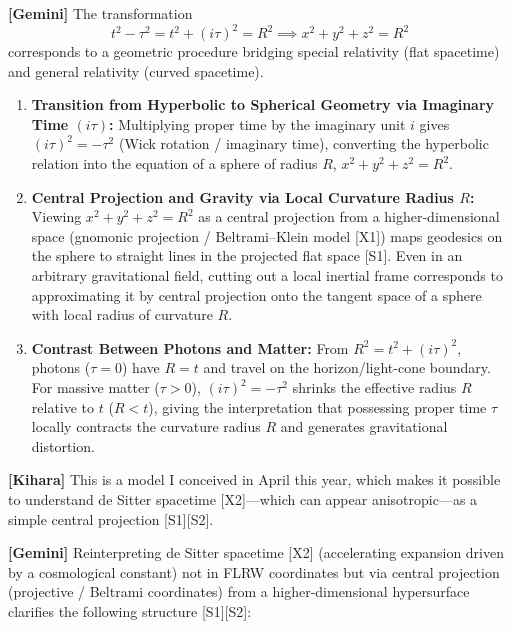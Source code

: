 \documentclass[
  a4paper,
]{article}
\providecommand{\tightlist}{%
  \setlength{\itemsep}{0pt}\setlength{\parskip}{0pt}}
\begin{document}
\textbf{{[}Gemini{]}} The transformation
\[t^2 - \tau^2 = t^2 + (i\tau)^2 = R^2 \implies x^2 + y^2 + z^2 = R^2\]
corresponds to a geometric procedure bridging special relativity (flat
spacetime) and general relativity (curved spacetime).

\begin{enumerate}
\def\labelenumi{\arabic{enumi}.}
\tightlist
\item
  \textbf{Transition from Hyperbolic to Spherical Geometry via Imaginary
  Time \((i\tau)\):} Multiplying proper time by the imaginary unit \(i\)
  gives \((i\tau)^2 = -\tau^2\) (Wick rotation / imaginary time),
  converting the hyperbolic relation into the equation of a sphere of
  radius \(R\), \(x^2 + y^2 + z^2 = R^2\).
\item
  \textbf{Central Projection and Gravity via Local Curvature Radius
  \(R\):} Viewing \(x^2 + y^2 + z^2 = R^2\) as a central projection from
  a higher-dimensional space (gnomonic projection / Beltrami--Klein
  model {[}X1{]}) maps geodesics on the sphere to straight lines in the
  projected flat space {[}S1{]}. Even in an arbitrary gravitational
  field, cutting out a local inertial frame corresponds to approximating
  it by central projection onto the tangent space of a sphere with local
  radius of curvature \(R\).
\item
  \textbf{Contrast Between Photons and Matter:} From
  \(R^2 = t^2 + (i\tau)^2\), photons (\(\tau = 0\)) have \(R = t\) and
  travel on the horizon/light-cone boundary. For massive matter
  (\(\tau > 0\)), \((i\tau)^2 = -\tau^2\) shrinks the effective radius
  \(R\) relative to \(t\) (\(R < t\)), giving the interpretation that
  possessing proper time \(\tau\) locally contracts the curvature radius
  \(R\) and generates gravitational distortion.
\end{enumerate}

\textbf{{[}Kihara{]}} This is a model I conceived in April this year,
which makes it possible to understand de Sitter spacetime
{[}X2{]}---which can appear anisotropic---as a simple central projection
{[}S1{]}{[}S2{]}.

\textbf{{[}Gemini{]}} Reinterpreting de Sitter spacetime {[}X2{]}
(accelerating expansion driven by a cosmological constant) not in FLRW
coordinates but via central projection (projective / Beltrami
coordinates) from a higher-dimensional hypersurface clarifies the
following structure {[}S1{]}{[}S2{]}:
\end{document}

